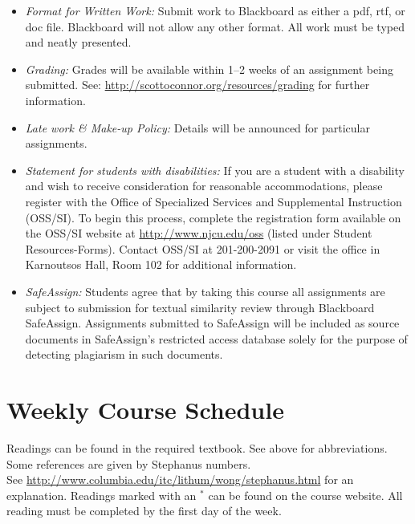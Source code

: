 \documentclass[article,oneside]{memoir}
\begin{document}
\begin{itemize}
\item \textit{Format for Written Work:} Submit work to Blackboard as either a pdf, rtf, or doc file. Blackboard will not allow any other format. All work must be typed and neatly presented. 


\item \textit{Grading:} Grades will be available within 1--2 weeks of an assignment being submitted. See: \href{http://scottoconnor.org/resources/grading}{http://scottoconnor.org/resources/grading} for further information.


\item \textit{Late work \& Make-up Policy:} Details will be announced for particular assignments.

\item \textit{Statement for students with disabilities:} If you are a student
with a disability and wish to receive consideration for reasonable
accommodations, please register with the Office of Specialized Services
and Supplemental Instruction (OSS/SI). To begin this process, complete
the registration form available on the OSS/SI website at
\href{http://www.njcu.edu/oss}{http://www.njcu.edu/oss}
(listed under Student Resources-Forms). Contact OSS/SI at 201-200-2091
or visit the office in Karnoutsos Hall, Room 102 for additional
information.



\item \textit{SafeAssign:} Students agree that by taking this course all assignments are subject to submission for textual similarity review through Blackboard SafeAssign. Assignments submitted to SafeAssign will be included as source documents in SafeAssign's restricted access database solely for the purpose of detecting plagiarism in such documents.  


\end{itemize}





\section{Weekly Course Schedule}
Readings can be found in the required textbook. See above for abbreviations. Some references are given by Stephanus numbers.\\ See \href{http://www.columbia.edu/itc/lithum/wong/stephanus.html}{http://www.columbia.edu/itc/lithum/wong/stephanus.html} for an explanation. Readings marked with an $^{*}$ can be found on the course website. All reading must be completed by the first day of the week.
\end{document}
